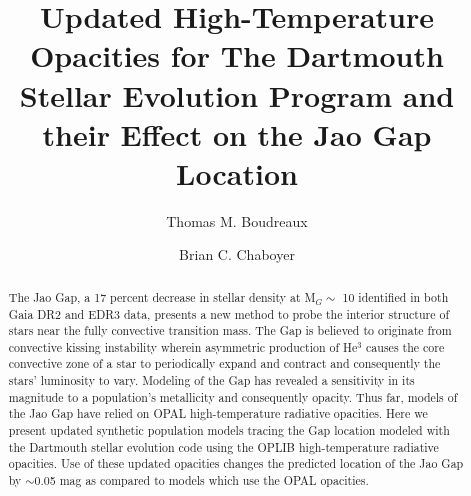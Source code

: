 \documentclass[twocolumn]{src/aastex631}
\begin{document}
\title{Updated High-Temperature Opacities for The Dartmouth Stellar Evolution
Program and their Effect on the Jao Gap Location}


\author[0000-0002-2600-7513]{Thomas M. Boudreaux}

\author[0000-0003-3096-4161]{Brian C. Chaboyer}


\begin{abstract}

The Jao Gap, a 17 percent decrease in stellar density at M$_{G} \sim$ 10
identified in both Gaia DR2 and EDR3 data, presents a new method to probe
the interior structure of stars near the fully convective transition mass.
The Gap is believed to originate from convective kissing instability
	wherein asymmetric production of He$^{3}$ causes the core convective zone of a
star to periodically expand and contract and consequently the stars’
luminosity to vary. Modeling of the Gap has revealed a sensitivity in its
magnitude to a population’s metallicity and consequently opacity. Thus far,
models of the Jao Gap have relied on OPAL high-temperature radiative
opacities. Here we present updated synthetic population models tracing the
Gap location modeled with the Dartmouth stellar evolution code using the
OPLIB high-temperature radiative opacities. Use of these updated opacities
changes the predicted location of the Jao Gap by $\sim$0.05 mag as compared to
models which use the OPAL opacities.

\end{abstract}














{}

\end{document}
